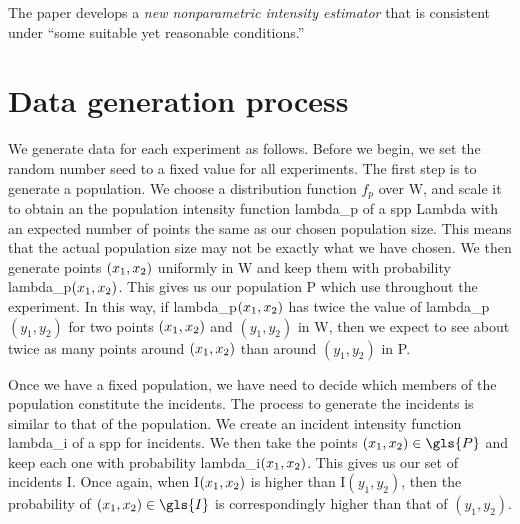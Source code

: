 The paper develops a \textit{new nonparametric intensity estimator} that is consistent under ``some suitable yet reasonable conditions.''


\section{Data generation process}
\label{sec:theory:data generation}

We generate data for each experiment as follows.
Before we begin, we set the random number seed to a fixed value for all experiments.
The first step is to generate a population.
We choose a distribution function $f_p$ over \gls{W}, and scale it to obtain an the population intensity function \gls{lambda_p} of a \gls{spp} \gls{Lambda} with an expected number of points the same as our chosen population size.
This means that the actual population size may not be exactly what we have chosen.
We then generate points $(x_1, x_2)$ uniformly in \gls{W} and keep them with probability \gls{lambda_p}$(x_1, x_2)$.
This gives us our population \gls{P} which use throughout the experiment.
In this way,
if \gls{lambda_p}$(x_1, x_2)$ has twice the value of \gls{lambda_p}$(y_1, y_2)$ for two points $(x_1, x_2)$ and $(y_1, y_2)$ in \gls{W},
then we expect to see about twice as many points around $(x_1, x_2)$ than around $(y_1, y_2)$ in \gls{P}.

Once we have a fixed population, we have need to decide which members of the population constitute the incidents.
The process to generate the incidents is similar to that of the population.
We create an incident intensity function \gls{lambda_i} of a \gls{spp} for incidents.
We then take the points $\xvec \in \gls{P}$ and keep each one with probability \gls{lambda_i}$(x_1, x_2)$.
This gives us our set of incidents \gls{I}.
Once again, when \gls{I}$(x_1, x_2)$ is higher than \gls{I}$(y_1, y_2)$,
then the probability of $\xvec \in \gls{I}$ is correspondingly higher than that of $(y_1, y_2)$.